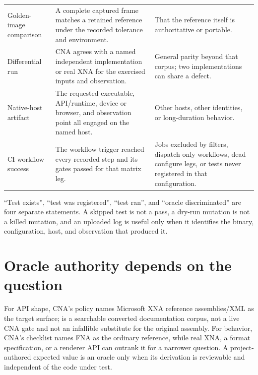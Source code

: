 \begin{small}
\begin{longtable}{>{\raggedright\arraybackslash}p{2.45cm}>{\raggedright\arraybackslash}p{4.15cm}>{\raggedright\arraybackslash}p{4.3cm}}
Golden-image comparison & A complete captured frame matches a retained reference under the
  recorded tolerance and environment. & That the reference itself is authoritative or portable. \\
Differential run & CNA agrees with a named independent implementation or real XNA for the
  exercised inputs and observation. & General parity beyond that corpus; two implementations can
  share a defect. \\
Native-host artifact & The requested executable, API/runtime, device or browser, and observation
  point all engaged on the named host. & Other hosts, other identities, or long-duration behavior. \\
CI workflow success & The workflow trigger reached every recorded step and its gates passed for
  that matrix leg. & Jobs excluded by filters, dispatch-only workflows, dead configure legs, or
  tests never registered in that configuration. \\
\bottomrule
\end{longtable}
\end{small}

``Test exists'', ``test was registered'', ``test ran'', and ``oracle discriminated'' are four
separate statements.  A skipped test is not a pass, a dry-run mutation is not a killed mutation,
and an uploaded log is useful only when it identifies the binary, configuration, host, and
observation that produced it.

\section{Oracle authority depends on the question}

For API shape, CNA's policy names Microsoft XNA reference assemblies/XML as the target surface;
 is a searchable converted documentation corpus, not a live CNA gate and not
an infallible substitute for the original assembly.  For behavior, CNA's checklist names FNA as
the ordinary reference, while real XNA, a format specification, or a renderer API can outrank it
for a narrower question.  A project-authored expected value is an oracle only when its derivation
is reviewable and independent of the code under test.

